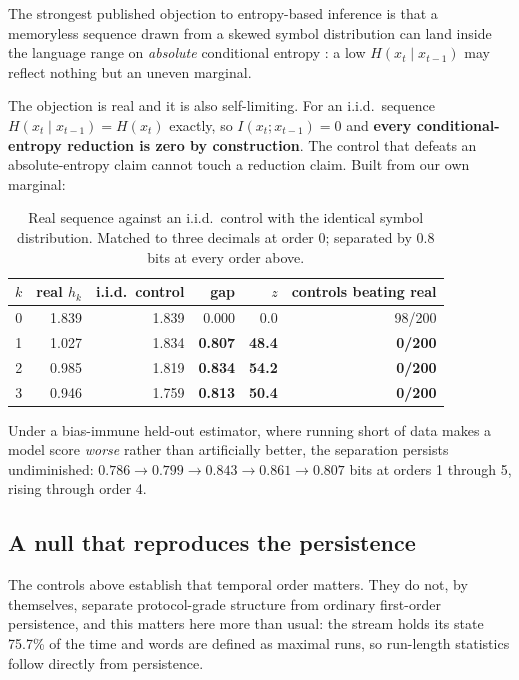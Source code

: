 \documentclass[11pt,a4paper]{article}
\newcommand{\bnum}[1]{\textbf{#1}}
\begin{document}
The strongest published objection to entropy-based inference is that a memoryless
sequence drawn from a skewed symbol distribution can land inside the language range on
\emph{absolute} conditional entropy \cite{sproat2014}: a low $H(x_t \mid x_{t-1})$ may
reflect nothing but an uneven marginal.

The objection is real and it is also self-limiting. For an i.i.d.\ sequence
$H(x_t \mid x_{t-1}) = H(x_t)$ exactly, so $I(x_t; x_{t-1}) = 0$ and \textbf{every
conditional-entropy reduction is zero by construction}. The control that defeats an
absolute-entropy claim cannot touch a reduction claim. Built from our own marginal:

\begin{table}[htbp]
\centering
\caption{Real sequence against an i.i.d.\ control with the identical symbol
distribution. Matched to three decimals at order 0; separated by 0.8 bits at every order
above.}
\label{tab:memoryless}
\begin{tabular}{rrrrrr}
\toprule
$k$ & real $h_k$ & i.i.d.\ control & \bnum{gap} & $z$ & controls beating real \\
\midrule
0 & 1.839 & 1.839 & 0.000 & 0.0 & 98/200 \\
1 & 1.027 & 1.834 & \bnum{0.807} & \bnum{48.4} & \bnum{0/200} \\
2 & 0.985 & 1.819 & \bnum{0.834} & \bnum{54.2} & \bnum{0/200} \\
3 & 0.946 & 1.759 & \bnum{0.813} & \bnum{50.4} & \bnum{0/200} \\
\bottomrule
\end{tabular}
\end{table}

Under a bias-immune held-out estimator, where running short of data makes a model score
\emph{worse} rather than artificially better, the separation persists undiminished:
$0.786 \rightarrow 0.799 \rightarrow 0.843 \rightarrow 0.861 \rightarrow 0.807$ bits at
orders 1 through 5, rising through order 4.

\subsection{A null that reproduces the persistence}
\label{sec:markov}

The controls above establish that temporal order matters. They do not, by themselves,
separate protocol-grade structure from ordinary first-order persistence, and this
matters here more than usual: the stream holds its state 75.7\% of the time and words
are defined as maximal runs, so run-length statistics follow directly from persistence.
\end{document}
